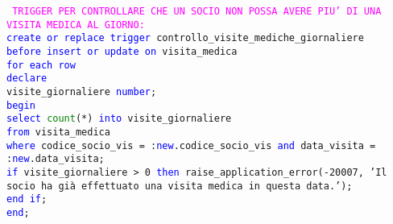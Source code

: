 \documentclass{article}
\begin{document}
    \begin{flushleft}
        \texttt{
        \textcolor{magenta}{TRIGGER PER CONTROLLARE CHE UN SOCIO NON POSSA AVERE PIU' DI UNA VISITA MEDICA \hspace*{0.5em}AL GIORNO:} \\
        \hspace*{2em} \textcolor{blue}{create or replace trigger} controllo\_visite\_mediche\_giornaliere \\
        \hspace*{2em} \textcolor{blue}{before insert or update on} visita\_medica \\
        \hspace*{2em} \textcolor{blue}{for each row} \\
        \hspace*{2em} \textcolor{blue}{declare} \\
        \hspace*{4em} visite\_giornaliere \textcolor{blue}{number}; \\
        \hspace*{2em} \textcolor{blue}{begin} \\
        \hspace*{4em} \textcolor{blue}{select} \textcolor{green}{count}(*) \textcolor{blue}{into} visite\_giornaliere \\
        \hspace*{4em} \textcolor{blue}{from} visita\_medica \\
        \hspace*{4em} \textcolor{blue}{where} codice\_socio\_vis = :\textcolor{blue}{new}.codice\_socio\_vis \textcolor{blue}{and} data\_visita = \hspace*{4.4em}:\textcolor{blue}{new}.data\_visita; \\
        \hspace*{4.4em}\textcolor{blue}{if} visite\_giornaliere > 0 \textcolor{blue}{then}
            raise\_application\_error(-20007, 'Il socio  \hspace*{4.5em}ha già effettuato una visita medica in questa data.'); \\
        \hspace*{4em} \textcolor{blue}{end if}; \\
        \hspace*{2em} \textcolor{blue}{end}; \\}
    \end{flushleft}
\end{document}
